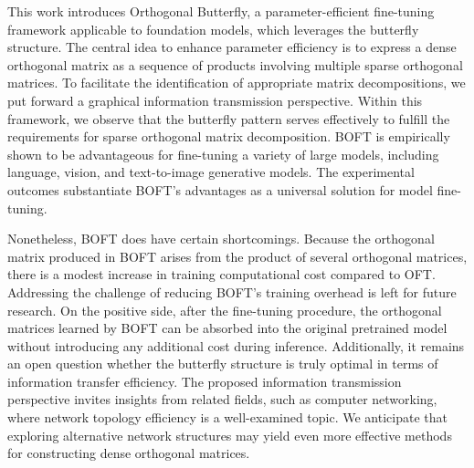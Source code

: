 This work introduces Orthogonal Butterfly, a parameter-efficient fine-tuning framework applicable to foundation models, which leverages the butterfly structure. The central idea to enhance parameter efficiency is to express a dense orthogonal matrix as a sequence of products involving multiple sparse orthogonal matrices. To facilitate the identification of appropriate matrix decompositions, we put forward a graphical information transmission perspective. Within this framework, we observe that the butterfly pattern serves effectively to fulfill the requirements for sparse orthogonal matrix decomposition. BOFT is empirically shown to be advantageous for fine-tuning a variety of large models, including language, vision, and text-to-image generative models. The experimental outcomes substantiate BOFT's advantages as a universal solution for model fine-tuning.

Nonetheless, BOFT does have certain shortcomings. Because the orthogonal matrix produced in BOFT arises from the product of several orthogonal matrices, there is a modest increase in training computational cost compared to OFT. Addressing the challenge of reducing BOFT’s training overhead is left for future research. On the positive side, after the fine-tuning procedure, the orthogonal matrices learned by BOFT can be absorbed into the original pretrained model without introducing any additional cost during inference. Additionally, it remains an open question whether the butterfly structure is truly optimal in terms of information transfer efficiency. The proposed information transmission perspective invites insights from related fields, such as computer networking, where network topology efficiency is a well-examined topic. We anticipate that exploring alternative network structures may yield even more effective methods for constructing dense orthogonal matrices.

